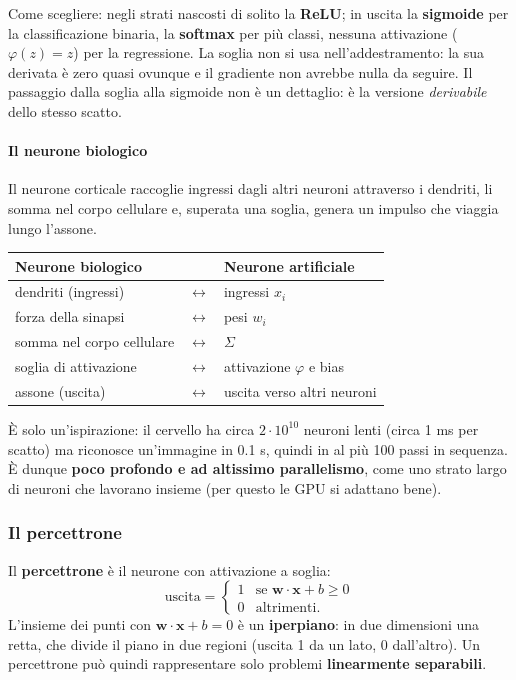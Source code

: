 \documentclass[12pt]{extarticle}
\begin{document}
\noindent Come scegliere: negli strati nascosti di solito la \textbf{ReLU}; in uscita la \textbf{sigmoide} per la classificazione binaria, la \textbf{softmax} per più classi, nessuna attivazione ($\varphi(z)=z$) per la regressione. La soglia non si usa nell'addestramento: la sua derivata è zero quasi ovunque e il gradiente non avrebbe nulla da seguire. Il passaggio dalla soglia alla sigmoide non è un dettaglio: è la versione \emph{derivabile} dello stesso scatto.

\paragraph{Il neurone biologico}
Il neurone corticale raccoglie ingressi dagli altri neuroni attraverso i dendriti, li somma nel corpo cellulare e, superata una soglia, genera un impulso che viaggia lungo l'assone.

\begin{center}
\small
\begin{tabular}{lcl}
    \toprule
    \textbf{Neurone biologico} & & \textbf{Neurone artificiale} \\
    \midrule
    dendriti (ingressi) & $\leftrightarrow$ & ingressi $x_i$ \\
    forza della sinapsi & $\leftrightarrow$ & pesi $w_i$ \\
    somma nel corpo cellulare & $\leftrightarrow$ & $\Sigma$ \\
    soglia di attivazione & $\leftrightarrow$ & attivazione $\varphi$ e bias \\
    assone (uscita) & $\leftrightarrow$ & uscita verso altri neuroni \\
    \bottomrule
\end{tabular}
\end{center}

\noindent È solo un'ispirazione: il cervello ha circa $2\cdot10^{10}$ neuroni lenti (circa 1 ms per scatto) ma riconosce un'immagine in 0.1 s, quindi in al più 100 passi in sequenza. È dunque \textbf{poco profondo e ad altissimo parallelismo}, come uno strato largo di neuroni che lavorano insieme (per questo le GPU si adattano bene).

\subsubsection{Il percettrone}

\noindent Il \textbf{percettrone} è il neurone con attivazione a soglia:
\[
\text{uscita}=\begin{cases}1&\text{se }\mathbf{w}\cdot\mathbf{x}+b\ge0\\0&\text{altrimenti.}\end{cases}
\]
L'insieme dei punti con $\mathbf{w}\cdot\mathbf{x}+b=0$ è un \textbf{iperpiano}: in due dimensioni una retta, che divide il piano in due regioni (uscita 1 da un lato, 0 dall'altro). Un percettrone può quindi rappresentare solo problemi \textbf{linearmente separabili}.
\end{document}
